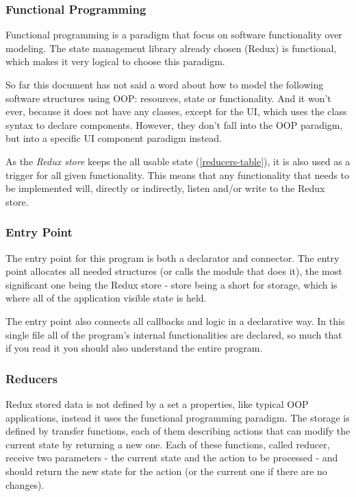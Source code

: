 \subsubsection{Functional Programming}
Functional programming is a paradigm that focus on software functionality over modeling.
The state management library already chosen (Redux) is functional, which makes it very
logical to choose this paradigm. 

So far this document has not said a word about how to model the following software structures
using OOP:  resources, state or functionality. And it won't ever, because it does not have any classes,
except for the UI, which uses the class syntax to declare components. However, they don't
fall into the OOP paradigm, but into a specific UI component paradigm instead. 

As the \textit{Redux store} keeps the all usable state (\autoref{reducers-table}), it is also
used as a trigger for all given functionality. This means that any functionality that
needs to be implemented will, directly or indirectly, listen and/or write to the Redux store.

\subsubsection{Entry Point}
The entry point for this program is both a declarator and connector. The entry point allocates
all needed structures (or calls the module that does it), the most significant one
being the Redux store \cite{Redux} - store being a short for storage, which is
where all of the application visible state is held. 

The entry point also connects all callbacks and logic in a declarative way. In
this single file all of the program's internal functionalities are declared,
so much that if you read it you should also understand the entire program.

\subsubsection{Reducers}
Redux stored data is not defined by a set a properties, like typical OOP applications,
instead it uses the functional programming paradigm. The storage is defined by transfer
functions, each of them describing actions that can modify the current state by
returning a new one. Each of these functions, called reducer, receive two parameters -
the current state and the action to be processed - and should return the new state
for the action (or the current one if there are no changes). 

